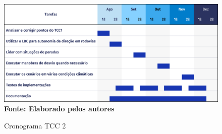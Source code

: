 \documentclass[a4paper,12pt,Times]{article}
\begin{document}
\begin{figure}[H]
    \centering
    \caption{Cronograma TCC 2}
    \includegraphics[scale=0.25]{figuras/TCC.png}\captionsetup{justification=centering}
  \vspace{-0.2cm}
     \\\textbf{\footnotesize Fonte: Elaborado pelos autores}
    \label{fig:cronograma}
\end{figure}







 
 




 \newpage
 \singlespace{
 
 
 }
\end{document}
